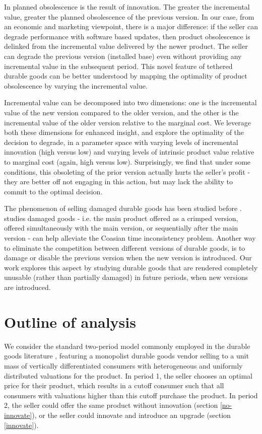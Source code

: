 \documentclass[isre,blindrev]{informs3} %
\begin{document}
In \cite{waldman_new_1993}  planned obsolescence is the result of innovation. The greater the incremental value, greater the planned obsolescence of the previous version. In our case, from an economic and marketing viewpoint, there is a major difference: if the seller can degrade performance with software based updates, then product obsolescence is delinked from the incremental value delivered by the newer product. The seller can degrade the previous version (installed base) even without providing any incremental value in the subsequent period. This novel feature of tethered durable goods can be better understood by mapping the optimality of product obsolescence by varying the incremental value. 

Incremental value can be decomposed into two dimensions: one is the incremental value of the new version compared to the older version, and the other
is the incremental value of the older version relative to the marginal cost. We leverage both these dimensions for enhanced insight, and explore
the optimality of the decision to degrade, in a parameter space with varying levels of incremental innovation (high versus low) and varying levels
of { }intrinsic product value relative to marginal cost (again, high versus low). Surprisingly, we find that under some conditions, this obsoleting
of the prior version actually hurts the seller{'}s profit - they are better off not engaging in this action, but may lack the ability to commit to
the optimal decision.

The phenomenon of selling damaged durable goods has been studied before \citep{deneckere_damaged_1996,hahn_damaged_2006}. \cite{hahn_damaged_2006} studies damaged goods
- i.e. the main product offered as a crimped version, offered simultaneously with the main version, or sequentially after the main version - can
help alleviate the Coasian time inconsistency problem. Another way to eliminate the competition between different versions of durable goods, is to
damage or disable the previous version when the new version is introduced. Our work explores this aspect by studying durable goods that are rendered
completely unusable (rather than partially damaged) in future periods, when new versions are introduced. 

\section{Outline of analysis}\label{outline}
We consider the standard two-period model commonly employed in the durable goods literature \citep{xin2018impact, jia_selling_2018, mehra_competitive_2012, bhaskaran_selling_2005, kornish_pricing_2001, ellison_neo-luddites_2000, dhebar_durable-goods_1994}, featuring a monopolist durable goods vendor selling to a unit mass of vertically differentiated consumers with heterogeneous and uniformly distributed valuations for the product. In period 1, the seller chooses an optimal price for their product, which results in a cutoff consumer such that all consumers with valuations higher than this cutoff purchase the product. In period 2, the seller could offer the same product without innovation (section \ref{no-innovate}), or the seller could innovate and introduce an upgrade (section \ref{innovate}). 
\end{document}
